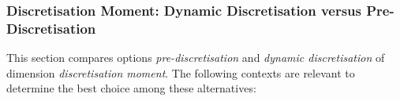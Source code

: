 \documentclass[smallextended]{svjour3}
\newcommand{\marvin}[1]{\textcolor{blue}{[#1]}}
\newcommand{\dimension}{\emph}
\newcommand{\parameter}{\emph}
\newcommand{\dyndis}{\parameter{dynamic discretisation}}
\newcommand{\predis}{\parameter{pre-discretisation}}
\begin{document}
%


\subsubsection{Discretisation Moment: Dynamic Discretisation versus Pre-Discretisation}
\label{section:discretisation-moment-dynamic-discretisation-versus-pre-discretisation}

This section compares options \predis{} and \dyndis{} of dimension \dimension{discretisation moment}.
The following contexts are relevant to determine the best choice among these alternatives:
\end{document}
